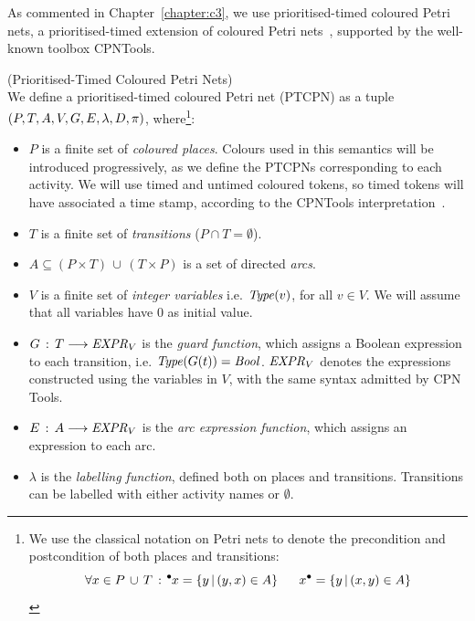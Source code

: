 As commented in Chapter~\ref{chapter:c3}, we use prioritised-timed coloured Petri nets, 
a prioritised-timed extension of coloured Petri nets~\cite{Jensen2009},
supported by the well-known toolbox CPNTools\cite{CPNTools}.

\begin{definition} (Prioritised-Timed Coloured Petri Nets)\\
We define a prioritised-timed coloured Petri net (PTCPN)
as a tuple  
$(P,T,A,V, \linebreak G,E,\lambda,D,\pi)$, where\footnote{
We use the classical notation on Petri nets to denote the
precondition and postcondition of both places and transitions:
%
\[ \forall x \in P\,\cup\,T\,:\,
\hspace*{-0.4em}~^{\bullet} \hspace*{-0.05em}x = \{ y \,|\, (y,x) \in A\}~~~~~
   x^{\bullet} = \{ y \,|\, (x,y) \in A\}
\]
}:
%
\begin{itemize}
\item $P$ is a finite set of {\em coloured places}.
Colours used in this semantics will be introduced progressively,
as we define the PTCPNs corresponding to each activity. 
We will use timed and untimed coloured tokens, so timed tokens will 
have associated a time stamp, according to the CPNTools
interpretation~\cite{Jensen2009}. 
%
\item $T$ is a finite set of {\em transitions} ($P\cap T = \emptyset$).
%
\item $A \subseteq (P\times T)\,\cup\,(T \times P)$ is a
set of directed {\em arcs}.
%
%
\item $V$ is a finite set of {\em integer variables}
i.e. ${\it Type}(v)$, for all $v \in V$.
We will assume that all variables have $0$ as initial value.
%
%
\item $G\,:\, T \longrightarrow {\it EXPR}_V$ is the
{\em guard function}, which assigns a Boolean
expression to each transition, i.e. ${\it Type}(G(t))={\it Bool}$.
${\it EXPR}_V$ denotes the
expressions constructed using the variables in $V$,
with the same syntax admitted by CPN Tools.
%
\item $E\,:\, A \longrightarrow {\it EXPR}_V$ is the
{\em arc expression function}, which assigns an expression
to each arc.
%
\item $\lambda$ is the {\em labelling function}, defined
both on places and transitions.
%
Transitions can be labelled with either activity names
or $\emptyset$. 
%

\end{itemize}
\end{definition}
